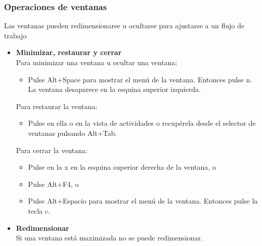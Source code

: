 \subsubsection{Operaciones de ventanas}
Las ventanas pueden redimensionarse u ocultarse para ajustarse a un flujo de trabajo
\begin{itemize}
\item {\bf Minimizar, restaurar y cerrar}\\
Para minimizar una ventana u ocultar una ventana:
\begin{itemize}
\item Pulse Alt+Space para mostrar el menú de la ventana. Entonces pulse n. La ventana desaparece en la esquina superior izquierda.
\end{itemize}
Para restaurar la ventana:
\begin{itemize}
\item Pulse en ella o en la vista de actividades o recupérela desde el selector de ventanas pulsando Alt+Tab.
\end{itemize}
Para cerrar la ventana:
\begin{itemize}
\item Pulse en la x en la esquina superior derecha de la ventana, o
\item Pulse Alt+F4, o
\item Pulse Alt+Espacio para mostrar el menú de la ventana. Entonces pulse la tecla c.
\end{itemize}
\item {\bf Redimensionar}\\
Si una ventana está maximizada no se puede redimensionar.\\


\end{itemize}
